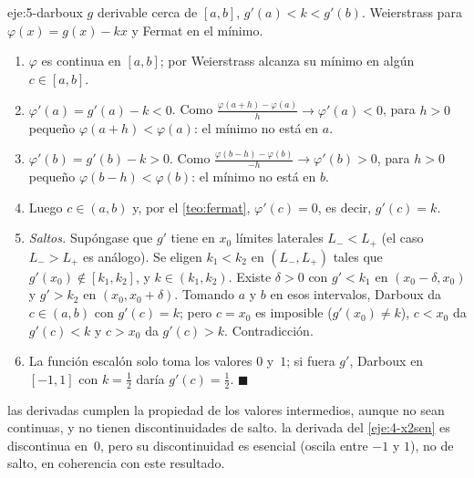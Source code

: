 \begin{solucion}{eje:5-darboux}
\datos $g$ derivable cerca de $[a,b]$, $g'(a)<k<g'(b)$.
\planteamiento Weierstrass para $\varphi(x)=g(x)-kx$ y Fermat en el mínimo.
\pasos
\begin{enumerate}[label=\arabic*.]
  \item $\varphi$ es continua en $[a,b]$; por Weierstrass alcanza su mínimo en algún $c\in[a,b]$.
  \item $\varphi'(a)=g'(a)-k<0$. Como $\frac{\varphi(a+h)-\varphi(a)}{h}\to\varphi'(a)<0$, para $h>0$ pequeño $\varphi(a+h)<\varphi(a)$: el mínimo no está en $a$.
  \item $\varphi'(b)=g'(b)-k>0$. Como $\frac{\varphi(b-h)-\varphi(b)}{-h}\to\varphi'(b)>0$, para $h>0$ pequeño $\varphi(b-h)<\varphi(b)$: el mínimo no está en $b$.
  \item Luego $c\in(a,b)$ y, por el \cref{teo:fermat}, $\varphi'(c)=0$, es decir, $g'(c)=k$.
  \item \emph{Saltos.} Supóngase que $g'$ tiene en $x_0$ límites laterales $L_-<L_+$ (el caso $L_->L_+$ es análogo). Se eligen $k_1<k_2$ en $(L_-,L_+)$ tales que $g'(x_0)\notin[k_1,k_2]$, y $k\in(k_1,k_2)$. Existe $\delta>0$ con $g'<k_1$ en $(x_0-\delta,x_0)$ y $g'>k_2$ en $(x_0,x_0+\delta)$. Tomando $a$ y $b$ en esos intervalos, Darboux da $c\in(a,b)$ con $g'(c)=k$; pero $c=x_0$ es imposible ($g'(x_0)\ne k$), $c<x_0$ da $g'(c)<k$ y $c>x_0$ da $g'(c)>k$. Contradicción.
  \item La función escalón solo toma los valores $0$ y~$1$; si fuera $g'$, Darboux en $[-1,1]$ con $k=\frac12$ daría $g'(c)=\frac12$. \hfill$\blacksquare$
\end{enumerate}
\resultado las derivadas cumplen la propiedad de los valores intermedios, aunque no sean continuas, y no tienen discontinuidades de salto.
\comprobacion la derivada del \cref{eje:4-x2sen} es discontinua en~0, pero su discontinuidad es esencial (oscila entre $-1$ y $1$), no de salto, en coherencia con este resultado.
\end{solucion}

